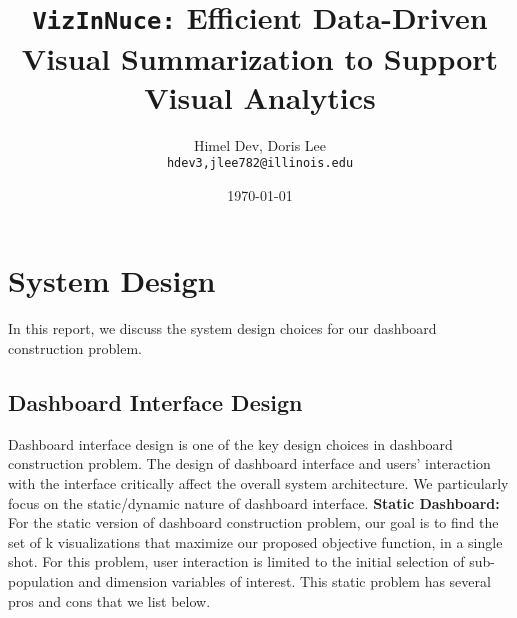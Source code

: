 \documentclass[11pt]{article}
\title{{\tt VizInNuce:} Efficient Data-Driven Visual Summarization to Support Visual Analytics}
\date{\today}
\author{%
    \Large{Himel Dev, Doris Lee}\\
    \texttt{hdev3,jlee782@illinois.edu}
}
\begin{document}
\maketitle




\iffalse
\section{System Design}
In this report, we discuss the system design choices for our dashboard construction problem. 

\subsection{Dashboard Interface Design}
Dashboard interface design is one of the key design choices in dashboard construction problem. The design of dashboard interface and users' interaction with the interface critically affect the overall system architecture. We particularly focus on the static/dynamic nature of dashboard interface.
\newline
\newline
\textbf{Static Dashboard:} For the static version of dashboard construction problem, our goal is to find the set of k visualizations that maximize our proposed objective function, in a single shot. For this problem, user interaction is limited to the initial selection of sub-population and dimension variables of interest. This static problem has several pros and cons that we list below.
\end{document}
